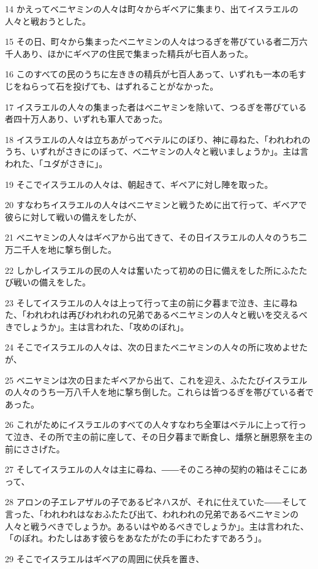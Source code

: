 \par 14 かえってベニヤミンの人々は町々からギベアに集まり、出てイスラエルの人々と戦おうとした。
\par 15 その日、町々から集まったベニヤミンの人々はつるぎを帯びている者二万六千人あり、ほかにギベアの住民で集まった精兵が七百人あった。
\par 16 このすべての民のうちに左ききの精兵が七百人あって、いずれも一本の毛すじをねらって石を投げても、はずれることがなかった。
\par 17 イスラエルの人々の集まった者はベニヤミンを除いて、つるぎを帯びている者四十万人あり、いずれも軍人であった。
\par 18 イスラエルの人々は立ちあがってベテルにのぼり、神に尋ねた、「われわれのうち、いずれがさきにのぼって、ベニヤミンの人々と戦いましょうか」。主は言われた、「ユダがさきに」。
\par 19 そこでイスラエルの人々は、朝起きて、ギベアに対し陣を取った。
\par 20 すなわちイスラエルの人々はベニヤミンと戦うために出て行って、ギベアで彼らに対して戦いの備えをしたが、
\par 21 ベニヤミンの人々はギベアから出てきて、その日イスラエルの人々のうち二万二千人を地に撃ち倒した。
\par 22 しかしイスラエルの民の人々は奮いたって初めの日に備えをした所にふたたび戦いの備えをした。
\par 23 そしてイスラエルの人々は上って行って主の前に夕暮まで泣き、主に尋ねた、「われわれは再びわれわれの兄弟であるベニヤミンの人々と戦いを交えるべきでしょうか」。主は言われた、「攻めのぼれ」。
\par 24 そこでイスラエルの人々は、次の日またベニヤミンの人々の所に攻めよせたが、
\par 25 ベニヤミンは次の日またギベアから出て、これを迎え、ふたたびイスラエルの人々のうち一万八千人を地に撃ち倒した。これらは皆つるぎを帯びている者であった。
\par 26 これがためにイスラエルのすべての人々すなわち全軍はベテルに上って行って泣き、その所で主の前に座して、その日夕暮まで断食し、燔祭と酬恩祭を主の前にささげた。
\par 27 そしてイスラエルの人々は主に尋ね、――そのころ神の契約の箱はそこにあって、
\par 28 アロンの子エレアザルの子であるピネハスが、それに仕えていた――そして言った、「われわれはなおふたたび出て、われわれの兄弟であるベニヤミンの人々と戦うべきでしょうか。あるいはやめるべきでしょうか」。主は言われた、「のぼれ。わたしはあす彼らをあなたがたの手にわたすであろう」。
\par 29 そこでイスラエルはギベアの周囲に伏兵を置き、
